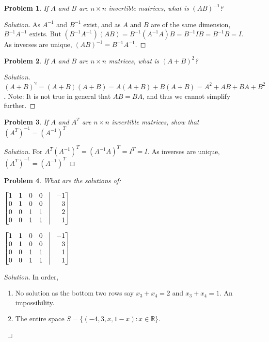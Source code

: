 \documentclass[oneside]{book}
\theoremstyle{mystyle}
\newtheorem{problem}{Problem}[section]
\begin{document}
\begin{problem}
If $A$ and $B$ are $n\times n$ invertible matrices, what is $(AB)^{-1}$?
\end{problem}
\begin{proof}[Solution]
As $A^{-1}$ and $B^{-1}$ exist, and as $A$ and $B$ are of the same dimension, $B^{-1}A^{-1}$ exists. But $(B^{-1}A^{-1})(AB) = B^{-1}(A^{-1}A)B = B^{-1}IB = B^{-1}B = I$. As inverses are unique, $(AB)^{-1} = B^{-1}A^{-1}$.
\end{proof}
\begin{problem}
If $A$ and $B$ are $n\times n$ matrices, what is $(A+B)^2$?
\end{problem}
\begin{proof}[Solution]
$(A+B)^2 =(A+B)(A+B) = A(A+B)+B(A+B)=A^2+AB+BA+B^2$. Note: It is not true in general that $AB=BA$, and thus we cannot simplify further.
\end{proof}
\begin{problem}
If $A$ and $A^T$ are $n\times n$ invertible matrices, show that $(A^T)^{-1} = (A^{-1})^T$
\end{problem}
\begin{proof}[Solution]
For $A^T(A^{-1})^T = (A^{-1}A)^T = I^T = I$. As inverses are unique, $(A^T)^{-1} = (A^{-1})^T$
\end{proof}
\begin{problem}
What are the solutions of:
\begin{enumerate}
\begin{multicols}{2}
    \item $\begin{bmatrix*}[r] 1 & 1 & 0 & 0 & \vline & -1 \\ 0 & 1 & 0 & 0 & \vline & 3 \\ 0 & 0 & 1 & 1 & \vline & 2 \\ 0 & 0 & 1 & 1 & \vline & 1 \end{bmatrix*}$
    \item $\begin{bmatrix*}[r] 1 & 1 & 0 & 0 & \vline & -1 \\ 0 & 1 & 0 & 0 & \vline & 3 \\ 0 & 0 & 1 & 1 & \vline & 1 \\ 0 & 0 & 1 & 1 & \vline & 1 \end{bmatrix*}$
\end{multicols}
\end{enumerate}
\end{problem}
\begin{proof}[Solution]
In order,
\begin{enumerate}
    \item No solution as the bottom two rows say $x_3 + x_4 = 2$ and $x_3 + x_4 = 1$. An impossibility.
    \item The entire space $S = \{(-4,3,x,1-x):x\in \mathbb{R}\}$.
\end{enumerate}
\end{proof}
\end{document}
